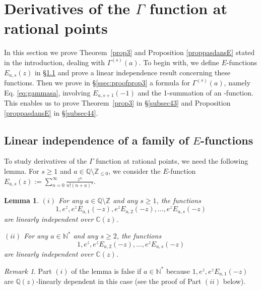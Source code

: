 \documentclass[reqno,12pt]{article}
\numberwithin{equation}{section}
\newtheorem{lem}{Lemma}
\theoremstyle{remark}
\newtheorem{Remark}{Remark}
\newcommand{\tantie}{\foreignlanguage{russian}{\CYREREV}}
\newcommand{\antie}{\text{\tantie}}
\begin{document}
\section{Derivatives of the $\Gamma $ function at rational points} \label{sec:consequences}

In this section we prove Theorem~\ref{prop3} and Proposition \ref{proppasdansE} stated in the introduction, dealing with $\Gamma^{(s)}(a)$. To begin with, we define $E$-functions $E_{a,s}(z)$ in \S \ref{ssec:conseq1} and prove a linear independence result concerning these functions. Then we prove in \S \ref{ssec:proofprop3} a formula for $\Gamma^{(s)}(a)$, namely Eq. \eqref{eq:gammasa}, involving $E_{a,s+1}(-1)$ and the 1-summation of an \antie-function. This enables us to prove Theorem~\ref{prop3} in \S \ref{subsec43} and Proposition \ref{proppasdansE} in \S \ref{subsec44}.

\subsection{Linear independence of a family of $E$-functions}\label{ssec:conseq1}

To study derivatives of the $\Gamma $ function at rational points, we need the following lemma. For $s\ge 1$ and  $a\in \mathbb Q\setminus \mathbb Z_{\leq 0}$, we consider the $E$-function $E_{a,s}(z):=\sum_{n=0}^\infty \frac{z^n}{n!(n+a)^s}$. 
\begin{lem}\label{lemmenew} 
$(i)$ For any $a\in \mathbb Q\setminus \mathbb Z$ and any $s\ge 1$,  the functions 
$$
1, e^z, e^zE_{a,1}(-z), e^zE_{a,2}(-z), \ldots, e^zE_{a,s}(-z)
$$ 
are linearly independent over $\mathbb C(z)$. 

\medskip

\noindent $(ii)$ For any $a\in \mathbb N^*$ and any $s\ge 2$,  the functions 
$$
1, e^z, e^zE_{a,2}(-z), \ldots, e^zE_{a,s}(-z)
$$ 
are linearly independent over $\mathbb C(z)$. 
\end{lem}
\begin{Remark} Part $(i)$ of the lemma is false if $a\in \mathbb N^{*}$ because $1, e^z, e^zE_{a,1}(-z)$ are $\mathbb Q(z)$-linearly dependent in this case (see the proof of Part $(ii)$ below).
\end{Remark}
\end{document}
